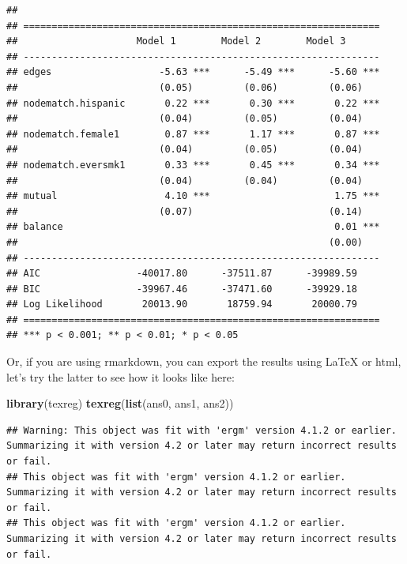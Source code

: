 \documentclass[]{book}
\newenvironment{Shaded}{\begin{snugshade}}{\end{snugshade}}
\newcommand{\KeywordTok}[1]{\textcolor[rgb]{0.13,0.29,0.53}{\textbf{#1}}}
\newcommand{\NormalTok}[1]{#1}
\begin{document}
\begin{verbatim}
## 
## ===============================================================
##                     Model 1        Model 2        Model 3      
## ---------------------------------------------------------------
## edges                   -5.63 ***      -5.49 ***      -5.60 ***
##                         (0.05)         (0.06)         (0.06)   
## nodematch.hispanic       0.22 ***       0.30 ***       0.22 ***
##                         (0.04)         (0.05)         (0.04)   
## nodematch.female1        0.87 ***       1.17 ***       0.87 ***
##                         (0.04)         (0.05)         (0.04)   
## nodematch.eversmk1       0.33 ***       0.45 ***       0.34 ***
##                         (0.04)         (0.04)         (0.04)   
## mutual                   4.10 ***                      1.75 ***
##                         (0.07)                        (0.14)   
## balance                                                0.01 ***
##                                                       (0.00)   
## ---------------------------------------------------------------
## AIC                 -40017.80      -37511.87      -39989.59    
## BIC                 -39967.46      -37471.60      -39929.18    
## Log Likelihood       20013.90       18759.94       20000.79    
## ===============================================================
## *** p < 0.001; ** p < 0.01; * p < 0.05
\end{verbatim}

Or, if you are using rmarkdown, you can export the results using LaTeX or html, let's try the latter to see how it looks like here:

\begin{Shaded}
\begin{Highlighting}[]
\KeywordTok{library}\NormalTok{(texreg)}
\KeywordTok{texreg}\NormalTok{(}\KeywordTok{list}\NormalTok{(ans0, ans1, ans2))}
\end{Highlighting}
\end{Shaded}

\begin{verbatim}
## Warning: This object was fit with 'ergm' version 4.1.2 or earlier. Summarizing it with version 4.2 or later may return incorrect results or fail.
## This object was fit with 'ergm' version 4.1.2 or earlier. Summarizing it with version 4.2 or later may return incorrect results or fail.
## This object was fit with 'ergm' version 4.1.2 or earlier. Summarizing it with version 4.2 or later may return incorrect results or fail.
\end{verbatim}
\end{document}

